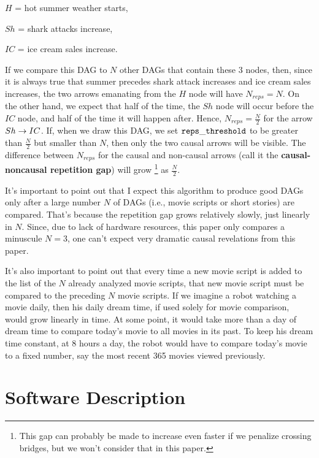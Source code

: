 \documentclass[12pt]{article}
\begin{document}
$H$ = hot summer weather starts,

$Sh$ = shark attacks increase, 

$IC$ = ice cream sales increase.

If we compare this DAG to $N$
other DAGs that contain these 3 nodes,
then, since it is always true
that summer precedes shark
attack increases and ice cream sales increases, the two arrows 
emanating
from the $H$ node 
will have $N_{reps} =N$.
On the other hand, we expect that half of the time, the $Sh$ node will occur before
the $IC$ node,
and half of the time it will happen after.
Hence, $N_{reps}=\frac{N}{2}$ for the
arrow $Sh\rightarrow IC$.
If, when we draw this DAG, we set $\tt reps\_threshold$ to be 
greater than $\frac{N}{2}$
but smaller than $N$,
then only the two causal arrows will be visible. The difference  between
 $N_{reps}$ for the causal and non-causal
 arrows (call it the {\bf causal-noncausal repetition gap}) will grow \footnote{This gap
  can probably be made to increase
  even faster if we penalize crossing
  bridges, but 
  we won't consider that in this paper.}
   as $\frac{N}{2}$.
   
   
 It's important to point out
 that I expect this algorithm
 to produce good DAGs only
 after a large number $N$ of DAGs (i.e.,
 movie scripts or short stories)
 are compared. That's because the repetition gap
 grows relatively slowly, just linearly in $N$. Since,
 due to lack of hardware resources,
 this paper
 only compares a minuscule $N=3$,
 one can't expect very dramatic causal
 revelations from this paper.

It's also important to point out
that every time a new movie script is added to
the list of the $N$ already
analyzed movie scripts,
that new movie script must be compared to the
preceding $N$ movie scripts.
If we imagine a robot watching a movie daily,
then his daily dream time, if used solely
for movie comparison, 
would grow linearly in time.
At some point, it would take more than a day
of dream time to
compare today's movie to all movies in its past.
To keep his dream time constant, at 8 hours a day,
the robot
would have to compare today's movie
to a fixed number, say the most recent 365 movies 
viewed previously.



 

\section{Software Description}
\end{document}
